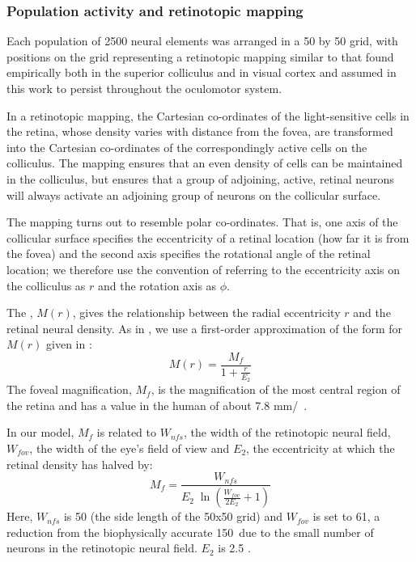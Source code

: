 \documentclass{frontiersSCNS}
\begin{document}
\subsubsection{Population activity and retinotopic mapping}

Each population of 2500 neural elements was arranged in a 50 by 50
grid, with positions on the grid representing a retinotopic mapping
similar to that found empirically both in the superior
colliculus \citep{ottes_visuomotor_1986} and in visual cortex
\citep{eric_l._schwartz_computational_1980}
and assumed in this work to persist throughout the oculomotor system.

In a retinotopic mapping, the Cartesian co-ordinates of the
light-sensitive cells in the retina, whose density varies with
distance from the fovea, are transformed into the Cartesian
co-ordinates of the correspondingly active cells on the
colliculus. The mapping ensures that an even density of cells can be
maintained in the colliculus, but ensures that a group of adjoining,
active, retinal neurons will always activate an adjoining group of
neurons on the collicular surface.

The mapping turns out to resemble polar co-ordinates. That is, one
axis of the collicular surface specifies the eccentricity of a retinal
location (how far it is from the fovea) and the second axis specifies
the rotational angle of the retinal location; we therefore use the
convention of referring to the eccentricity axis on the colliculus as
$r$ and the rotation axis as $\phi$.

The , $M(r)$, gives the relationship
between the radial eccentricity $r$ and the retinal neural density. As
in
\cite{cope_basal_2017}, we use a first-order approximation of the form
for $M(r)$ given in \cite{rovamo_estimation_1979}:
\begin{equation} \label{eq:cmf}
M(r) = \frac{M_f}{1+\frac{r}{E_2}}
\end{equation}
The foveal magnification, $M_f$, is the magnification of the most
central region of the retina and has a value in the human of about 7.8
mm/\dg~\citep{rovamo_estimation_1979}.

In our model, $M_f$ is related to $W_{nfs}$, the width of the
retinotopic neural field, $W_{fov}$, the width of the eye's field of
view and $E_2$, the eccentricity at which the retinal density has
halved by:
\begin{equation} \label{eq:fm}
   M_f = \frac {W_{nfs}} {E_2\;\ln\left(\frac{W_{fov}}{2 E_2} + 1\right)}
\end{equation}
Here, $W_{nfs}$ is 50 (the side length of the 50x50 grid) and
$W_{fov}$ is set to 61\dg, a reduction from the biophysically accurate
150\dg~due to the small number of neurons in the retinotopic neural
field. $E_2$ is
2.5 \citep{cope_basal_2017,slotnick_electrophysiological_2001}.
\end{document}
